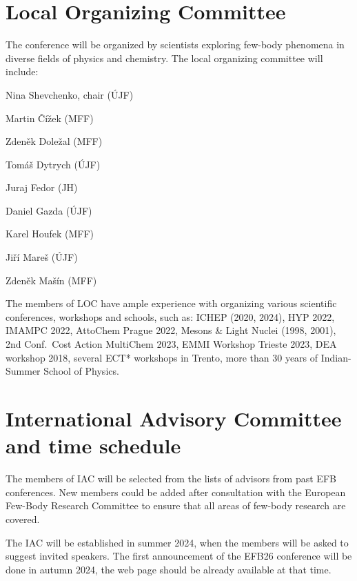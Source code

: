 \documentclass[12pt]{extarticle}
\newif\iftwocolloc
\newcommand*\sq{\mathbin{\vcenter{\hbox{\rule{.8ex}{.8ex}}}}}
\newenvironment{t_sq_itemize}
{\begin{itemize}[topsep=0pt, parsep=0pt, itemsep=0pt, leftmargin=*]
    \renewcommand{\labelitemi}{{\(\sq\)}}}
  {\end{itemize}}
\begin{document}
\section*{Local Organizing Committee}
\noindent
The conference will be organized by scientists exploring few-body
phenomena in diverse fields of physics and chemistry. The local
organizing committee will include:
\iftwocolloc\begin{multicols}{2}\else{}\fi
\begin{t_sq_itemize}
  \def\ujf{ÚJF}%
  \def\jh{JH}%
  \def\mff{MFF}%
\item Nina Shevchenko, chair (\ujf)
\item Martin Čížek (\mff)
\item Zdeněk Doležal (\mff)
\item Tomáš Dytrych (\ujf)
\item Juraj Fedor (\jh)
\item[]{}
\item Daniel Gazda (\ujf)
\item Karel Houfek (\mff)
\item Jiří Mareš (\ujf)
\item Zdeněk Mašín (\mff)
\end{t_sq_itemize}
\iftwocolloc\end{multicols}\else{}\fi

\iftwocolloc\noindent\else{}\fi
The members of LOC have ample experience with organizing various
scientific conferences, workshops and schools, such as: ICHEP (2020,
2024), HYP 2022, IMAMPC 2022, AttoChem Prague 2022, Mesons \& Light
Nuclei (1998, 2001), 2nd Conf.\ Cost Action MultiChem 2023, EMMI
Workshop Trieste 2023, DEA workshop 2018, several ECT* workshops in
Trento, more than 30 years of Indian-Summer School of Physics.

\section*{International Advisory Committee and time schedule}
\noindent
The members of IAC will be selected from the lists of advisors from
past EFB conferences. New members could be added after consultation
with the European Few-Body Research Committee to ensure that all areas
of few-body research are covered.

The IAC will be established in summer 2024, when the members will be
asked to suggest invited speakers. The first announcement of the EFB26
conference will be done in autumn 2024, the web page should be already
available at that time.
\end{document}
